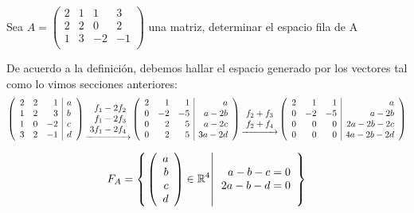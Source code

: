 \begin{ejemplo}
Sea $A=
\left(
\begin{array}{rrrr}
2&1&1&3\\
2&2&0&2\\
1&3&-2&-1\\
\end{array}
\right)$ una matriz, determinar el espacio fila de A

 
De acuerdo a la definición, debemos hallar el espacio generado por los vectores  tal como lo vimos secciones anteriores:
$$\reducir{rrr|l}{2&2&1&a\\
1&2&3&b\\
1&0&-2&c\\
3&2&-1&d\\}
\underrightarrow{\begin{array}{r}
    f_1 - 2f_2\\
    f_1 - 2f_3\\
    3f_1 - 2f_4
\end{array}}
\reducir{rrr|r}{2&1&1&a\\
0&-2&-5&a-2b\\
0&2&5&a-2c\\
0&2&5&3a-2d\\}
\underrightarrow{\begin{array}{r}
    f_2 + f_3\\
    f_2 + f_4
\end{array}}
\reducir{rrr|r}{2&1&1&a\\
0&-2&-5&a-2b\\
0&0&0&2a-2b-2c\\
0&0&0&4a-2b-2d\\
}$$

\[F_A=\llaves{\vectr4{a}{b}{c}{d} \in \rcuatro}
{\begin{array}{r}
a-b-c=0\\
2a-b-d=0\\
\end{array}}
\]

\end{ejemplo}


\newpage
